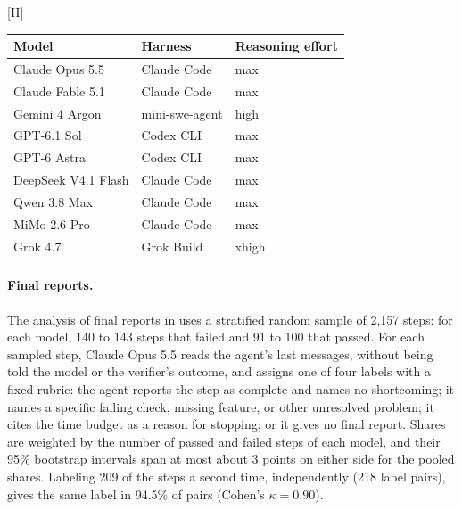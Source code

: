 \documentclass{article}
\makeatletter
\renewenvironment{table}
  {\setlength{\abovecaptionskip}{\@abovecaptionskip}%
   \setlength{\belowcaptionskip}{\@belowcaptionskip}%
   \@float{table}}
  {\end@float}
\makeatother
\begin{document}
\begin{table}[H]
  \centering
  \small
  \begin{tabular}{@{}l l l@{}}
    \toprule
    Model & Harness & Reasoning effort \\
    \midrule
    Claude Opus 5.5     & Claude Code    & max \\
    Claude Fable 5.1    & Claude Code    & max \\
    Gemini 4 Argon      & mini-swe-agent & high \\
    GPT-6.1 Sol         & Codex CLI      & max \\
    GPT-6 Astra         & Codex CLI      & max \\
    DeepSeek V4.1 Flash & Claude Code    & max \\
    Qwen 3.8 Max        & Claude Code    & max \\
    MiMo 2.6 Pro        & Claude Code    & max \\
    Grok 4.7            & Grok Build     & xhigh \\
    \bottomrule
  \end{tabular}
  \caption{Agent harness and reasoning effort for each model.}
  \label{tab:harness}
\end{table}

\paragraph{Final reports.}
The analysis of final reports in  uses a stratified
random sample of 2,157 steps: for each model, 140 to 143 steps that failed and 91
to 100 that passed. For each sampled step, Claude Opus 5.5 reads the agent's last messages,
without being told the model or the verifier's outcome, and assigns one of four
labels with a fixed rubric: the agent reports the step as complete and names no
shortcoming; it names a specific failing check, missing feature, or other
unresolved problem; it cites the time budget as a reason for stopping; or it
gives no final report. Shares are weighted by the number of passed and failed
steps of each model, and their 95\% bootstrap intervals span at most about 3
points on either side for the pooled shares. Labeling 209 of the steps a second
time, independently (218 label pairs), gives the same label in 94.5\% of pairs
(Cohen's $\kappa = 0.90$).
\end{document}
